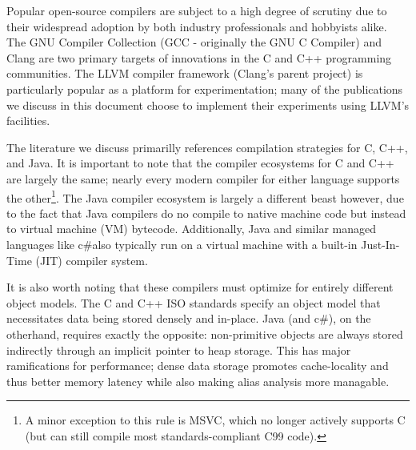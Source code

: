 \documentclass[nobib]{tufte-handout}
\newcommand{\csharp}{c\#}
\begin{document}
Popular open-source compilers are subject to a high degree of scrutiny due to their widespread adoption by both industry professionals and hobbyists alike.  The GNU Compiler Collection (GCC - originally the GNU C Compiler) and Clang are two primary targets of innovations in the C and C++ programming communities.  The LLVM compiler framework (Clang's parent project) is particularly popular as a platform for experimentation; many of the publications we discuss in this document choose to implement their experiments using LLVM's facilities.

The literature we discuss primarilly references compilation strategies for C, C++, and Java.  It is important to note that the compiler ecosystems for C and C++ are largely the same; nearly every modern compiler for either language supports the other\footnote{A minor exception to this rule is MSVC, which no longer actively supports C (but can still compile most standards-compliant C99 code).}.  The Java compiler ecosystem is largely a different beast however, due to the fact that Java compilers do no compile to native machine code but instead to virtual machine (VM) bytecode.  Additionally, Java and similar managed languages like \csharp also typically run on a virtual machine with a built-in Just-In-Time (JIT) compiler system.  

It is also worth noting that these compilers must optimize for entirely different object models.  The C and C++ ISO standards specify an object model that necessitates data being stored densely and in-place.  Java (and \csharp), on the otherhand, requires exactly the opposite: non-primitive objects are always stored indirectly through an implicit pointer to heap storage.  This has major ramifications for performance; dense data storage promotes cache-locality and thus better memory latency while also making alias analysis more managable.
\end{document}
